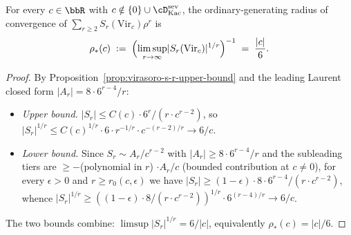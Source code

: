 \begin{proposition}
\label{prop:virasoro-rho-star-closed-form}
For every $c \in \bbR$ with
$c \notin \{0\} \cup \cD^{\mathrm{sev}}_{\mathrm{Kac}}$, the
ordinary-generating radius of convergence of
$\sum_{r \ge 2} S_r(\mathrm{Vir}_c) \rho^r$ is
\[
 \rho_*(c)
 \;:=\;
 \Bigl( \limsup_{r \to \infty} \lvert S_r(\mathrm{Vir}_c) \rvert^{1/r}
 \Bigr)^{-1}
 \;=\;
 \frac{\lvert c \rvert}{6}.
\]
\end{proposition}

\begin{proof}
By Proposition~\ref{prop:virasoro-s-r-upper-bound} and the leading
Laurent closed form $\lvert A_r \rvert = 8 \cdot 6^{r-4} / r$:
\begin{itemize}[nosep]
\item \emph{Upper bound.} $\lvert S_r \rvert \le C(c) \cdot 6^r /
 (r \cdot c^{r-2})$, so
$\lvert S_r \rvert^{1/r} \le C(c)^{1/r} \cdot 6 \cdot r^{-1/r} \cdot
c^{-(r-2)/r} \to 6/c$.
\item \emph{Lower bound.} Since $S_r \sim A_r / c^{r-2}$ with
$\lvert A_r \rvert \ge 8 \cdot 6^{r-4} / r$ and the subleading tiers
are $\ge -$(polynomial in $r$) $\cdot A_r / c$ (bounded contribution
at $c \neq 0$), for every $\epsilon > 0$ and $r \ge r_0(c, \epsilon)$
we have $\lvert S_r \rvert \ge (1 - \epsilon) \cdot 8 \cdot 6^{r-4} /
(r \cdot c^{r-2})$, whence
$\lvert S_r \rvert^{1/r} \ge ((1-\epsilon) \cdot 8 / (r \cdot
c^{r-2}))^{1/r} \cdot 6^{(r-4)/r} \to 6 / c$.
\end{itemize}
The two bounds combine: $\limsup \lvert S_r \rvert^{1/r} = 6 / \lvert
c \rvert$, equivalently $\rho_*(c) = \lvert c \rvert / 6$.
\end{proof}

